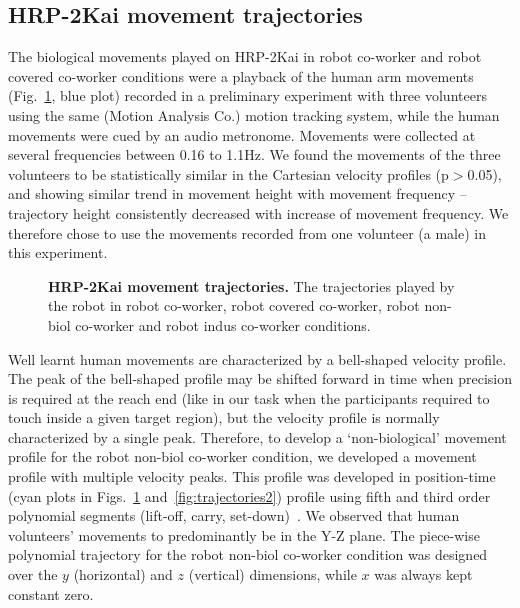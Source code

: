 \subsection{HRP-2Kai movement trajectories} \label{HRP2_Traj}


The biological movements played on HRP-2Kai in robot co-worker and robot covered co-worker conditions were a playback of the human arm movements (Fig.~\ref{fig:trajectories}, blue plot) recorded in a preliminary experiment with three volunteers using the same (Motion Analysis Co.) motion tracking system, while the human movements were cued by an audio metronome. Movements were collected at several frequencies between 0.16 to 1.1Hz. We found the movements of the three volunteers to be statistically similar in the Cartesian velocity profiles (p$>$0.05), and showing similar trend in movement height with movement frequency --trajectory height consistently decreased with increase of movement frequency. We therefore chose to use the movements recorded from one volunteer (a male) in this experiment.


\begin{figure}[hpt]
	\caption{{\bf HRP-2Kai movement trajectories.} The trajectories played by the robot in robot co-worker, robot covered co-worker, robot non-biol co-worker and robot indus co-worker conditions.}
	\label{fig:trajectories}
\end{figure}


Well learnt human movements are characterized by a bell-shaped velocity profile. The peak of the bell-shaped profile may be shifted forward in time when precision is required at the reach end (like in our task when the participants required to touch inside a given target region), but the velocity profile is normally characterized by a single peak. Therefore, to develop a `non-biological' movement profile for the robot non-biol co-worker condition, we developed a movement profile with multiple velocity peaks. This profile was developed in position-time (cyan plots in Figs.~\ref{fig:trajectories} and~\ref{fig:trajectories2}) profile using fifth and third order polynomial segments (lift-off, carry, set-down)~\cite{Biagiotti:Springer:2008}. We observed that human volunteers' movements to predominantly be in the Y-Z plane. The piece-wise polynomial trajectory for the robot non-biol co-worker condition was designed over the $y$ (horizontal) and $z$ (vertical) dimensions, while $x$ was always kept constant zero.


